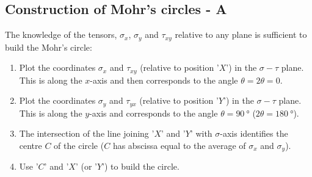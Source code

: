 \documentclass[class=report, crop=false, 12pt,a4paper]{standalone}
\begin{document}
\subsection{Construction of Mohr's circles - A}
The knowledge of the tensors, $\sigma_x$, $\sigma_y$ and $\tau_{xy}$ relative to any plane is sufficient to build the Mohr's circle:
\begin{enumerate}
    \item Plot the coordinates $\sigma_x$ and $\tau_{xy}$ (relative to position '$X$') in the $\sigma - \tau$ plane. This is along the $x$-axis and then corresponds to the angle $\theta = 2\theta = 0$.
    \item Plot the coordinates $\sigma_y$ and $\tau_{yx}$ (relative to position '$Y$') in the $\sigma - \tau$ plane. This is along the $y$-axis and corresponds to the angle $\theta = \SI{90}{\degree}$ ($2\theta = \SI{180}{\degree}$).
    \item The intersection of the line joining '$X$' and '$Y$' with $\sigma$-axis identifies the centre $C$ of the circle ($C$ has abscissa equal to the average of $\sigma_x$ and $\sigma_y$).
    \item Use '$C$' and '$X$' (or '$Y$') to build the circle.
\end{enumerate}
\end{document}
